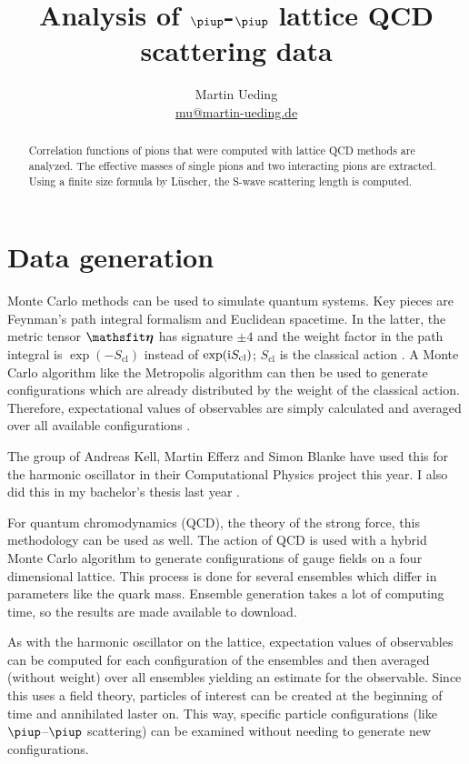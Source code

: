 \documentclass[11pt, english, fleqn, DIV=10, headinclude]{scrartcl}
\title{Analysis of $\piup$-$\piup$ lattice QCD \\ scattering data}
\author{
    Martin Ueding \\ \small{\href{mailto:mu@martin-ueding.de}{mu@martin-ueding.de}}
}
\begin{document}
\maketitle

\begin{abstract}
    Correlation functions of pions that were computed with lattice QCD methods
    are analyzed. The effective masses of single pions and two interacting
    pions are extracted. Using a finite size formula by Lüscher, the S-wave
    scattering length is computed.
\end{abstract}

\tableofcontents

\newpage

\section{Data generation}

Monte Carlo methods can be used to simulate quantum systems. Key pieces are
Feynman's path integral formalism and Euclidean spacetime. In the latter, the metric
tensor $\tens\eta$ has signature $\pm 4$ and the weight factor in the path
integral is $\exp(-S_\text{cl})$ instead of $\exp(\mathrm i S_\text{cl})$; 
$S_\text{cl}$ is the classical action
\parencite[Section~2]{Creutz/Statistical_Approach_QM}. A Monte Carlo algorithm
like the Metropolis algorithm can then be used to generate configurations which
are already distributed by the weight of the classical action. Therefore,
expectational values of observables are simply calculated and averaged over all
available configurations \parencite[(3.7)]{Creutz/Statistical_Approach_QM}.

The group of Andreas Kell, Martin Efferz and Simon Blanke have used this for
the harmonic oscillator in their Computational Physics project this year. I
also did this in my bachelor's thesis last year \parencite{Ueding/Bachelorarbeit}.

For quantum chromodynamics (QCD), the theory of the strong force, this
methodology can be used as well. The action of QCD is used with a hybrid Monte
Carlo algorithm to generate configurations of gauge fields on a four
dimensional lattice. This process is done for several ensembles which differ in
parameters like the quark mass. Ensemble generation takes a lot of computing
time, so the results are made available to download.

As with the harmonic oscillator on the lattice, expectation values of
observables can be computed for each configuration of the ensembles and then
averaged (without weight) over all ensembles yielding an estimate for the
observable. Since this uses a field theory, particles of interest can be
created at the beginning of time and annihilated laster on. This way, specific
particle configurations (like $\piup$–$\piup$ scattering) can be examined
without needing to generate new configurations.
\end{document}
